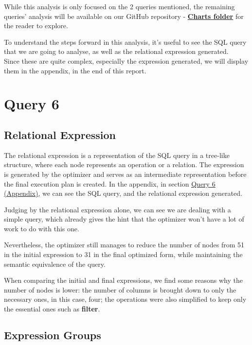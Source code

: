 \documentclass[a4paper,12pt]{scrreprt}
\begin{document}
While this analysis is only focused on the 2 queries mentioned, the remaining queries' analysis will be available on our GitHub repository - \textbf{\href{https://github.com/Blackparkd/risinglight/tree/main/src/planner/outputs/bar_charts}{Charts folder}} for the reader to explore. 

To understand the steps forward in this analysis, it's useful to see the SQL query that we are going to analyse, as well as the relational expression generated. \\
Since these are quite complex, especially the expression generated, we will display them in the appendix, in the end of this report.

\section{Query 6}

\subsection{Relational Expression}

The relational expression is a representation of the SQL query in a tree-like structure, where each node represents an operation or a relation. The expression is generated by the optimizer and serves as an intermediate representation before the final execution plan is created.
In the appendix, in section \underline{\hyperref[subsec:query6]{Query 6 (Appendix)}}, we can see the SQL query, and the relational expression generated. 

Judging by the relational expression alone, we can see we are dealing with a simple query, which already gives the hint that the optimizer won't have a lot of work to do with this one.

Nevertheless, the optimizer still manages to reduce the number of nodes from 51 in the initial expression to 31 in the final optimized form, while maintaining the semantic equivalence of the query. 

When comparing the initial and final expressions, we find some reasons why the number of nodes is lower: the number of columns is brought down to only the necessary ones, in this case, four; the operations were also simplified to keep only the essential ones such as \textbf{filter}. 

\subsection{Expression Groups}
\end{document}
